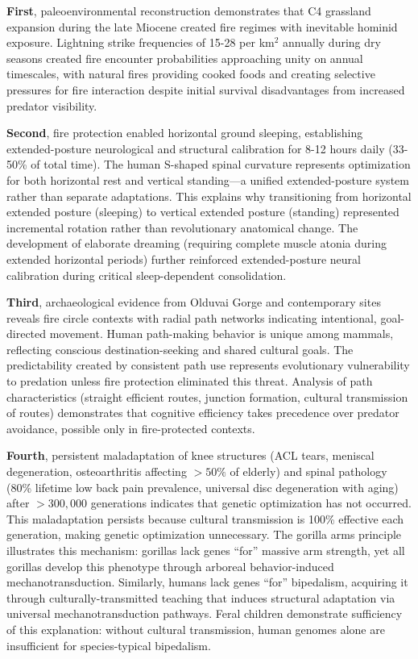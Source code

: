 \documentclass[12pt,a4paper]{article}
\begin{document}
\textbf{First}, paleoenvironmental reconstruction demonstrates that C4 grassland expansion during the late Miocene created fire regimes with inevitable hominid exposure. Lightning strike frequencies of 15-28 per km$^2$ annually during dry seasons created fire encounter probabilities approaching unity on annual timescales, with natural fires providing cooked foods and creating selective pressures for fire interaction despite initial survival disadvantages from increased predator visibility.

\textbf{Second}, fire protection enabled horizontal ground sleeping, establishing extended-posture neurological and structural calibration for 8-12 hours daily (33-50\% of total time). The human S-shaped spinal curvature represents optimization for both horizontal rest and vertical standing—a unified extended-posture system rather than separate adaptations. This explains why transitioning from horizontal extended posture (sleeping) to vertical extended posture (standing) represented incremental rotation rather than revolutionary anatomical change. The development of elaborate dreaming (requiring complete muscle atonia during extended horizontal periods) further reinforced extended-posture neural calibration during critical sleep-dependent consolidation.

\textbf{Third}, archaeological evidence from Olduvai Gorge and contemporary sites reveals fire circle contexts with radial path networks indicating intentional, goal-directed movement. Human path-making behavior is unique among mammals, reflecting conscious destination-seeking and shared cultural goals. The predictability created by consistent path use represents evolutionary vulnerability to predation unless fire protection eliminated this threat. Analysis of path characteristics (straight efficient routes, junction formation, cultural transmission of routes) demonstrates that cognitive efficiency takes precedence over predator avoidance, possible only in fire-protected contexts.

\textbf{Fourth}, persistent maladaptation of knee structures (ACL tears, meniscal degeneration, osteoarthritis affecting $>50\%$ of elderly) and spinal pathology (80\% lifetime low back pain prevalence, universal disc degeneration with aging) after $>300,000$ generations indicates that genetic optimization has not occurred. This maladaptation persists because cultural transmission is 100\% effective each generation, making genetic optimization unnecessary. The gorilla arms principle illustrates this mechanism: gorillas lack genes ``for'' massive arm strength, yet all gorillas develop this phenotype through arboreal behavior-induced mechanotransduction. Similarly, humans lack genes ``for'' bipedalism, acquiring it through culturally-transmitted teaching that induces structural adaptation via universal mechanotransduction pathways. Feral children demonstrate sufficiency of this explanation: without cultural transmission, human genomes alone are insufficient for species-typical bipedalism.
\end{document}
